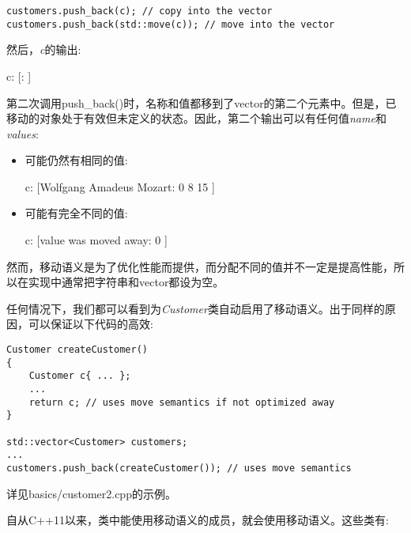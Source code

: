 \begin{lstlisting}[caption={}]
customers.push_back(c); // copy into the vector
customers.push_back(std::move(c)); // move into the vector
\end{lstlisting}

然后，\textit{c}的输出:\par

\begin{tcolorbox}[colback=white,colframe=black]
c: [: ]
\end{tcolorbox}

第二次调用push\_back()时，名称和值都移到了vector的第二个元素中。但是，已移动的对象处于有效但未定义的状态。因此，第二个输出可以有任何值\textit{name}和\textit{values}:\par

\begin{itemize}
	\item 可能仍然有相同的值:\par
	\begin{tcolorbox}[colback=white,colframe=black]
	c: [Wolfgang Amadeus Mozart: 0 8 15 ]
	\end{tcolorbox}
	\item 可能有完全不同的值:\par
	\begin{tcolorbox}[colback=white,colframe=black]
	c: [value was moved away: 0 ]
	\end{tcolorbox}
\end{itemize}

然而，移动语义是为了优化性能而提供，而分配不同的值并不一定是提高性能，所以在实现中通常把字符串和vector都设为空。\par

任何情况下，我们都可以看到为\textit{Customer}类自动启用了移动语义。出于同样的原因，可以保证以下代码的高效:\par

\begin{lstlisting}[caption={}]
Customer createCustomer()
{
	Customer c{ ... };
	...
	return c; // uses move semantics if not optimized away
}

std::vector<Customer> customers;
...
customers.push_back(createCustomer()); // uses move semantics
\end{lstlisting}

详见basics/customer2.cpp的示例。\par

自从C++11以来，类中能使用移动语义的成员，就会使用移动语义。这些类有:\par

